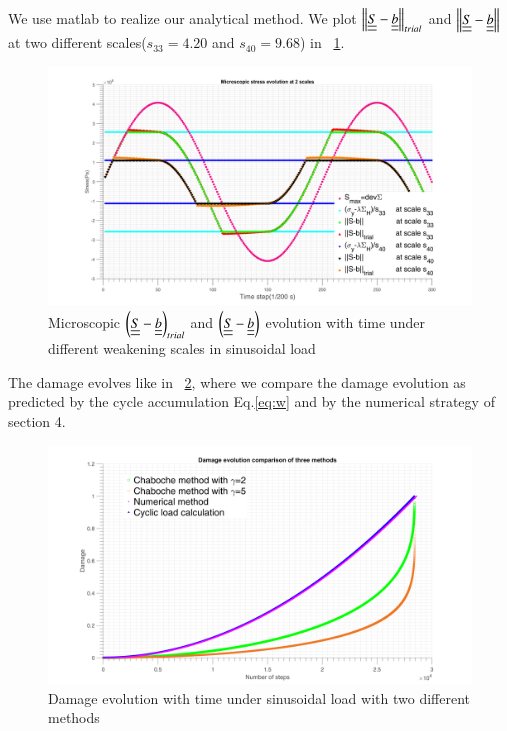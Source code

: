 \documentclass[3p,times,number,review]{elsarticle}
\newcommand{\figref}[1]{\figurename~\ref{#1}}
\begin{document}
We use matlab to realize our analytical method. We plot $\left\|  \uline{\uline{S}}-\uline{\uline{b}}\right\|_{trial}$ and $\left\|  \uline{\uline{S}}-\uline{\uline{b}}\right\|$ at two different scales($s_{33}=4.20$ and $s_{40}=9.68$) in \figref{trialsin}.
\begin{figure}[!h]
	\centering
	\includegraphics[width=\textwidth]{figures//trialsin.png} 
	\caption{Microscopic $\left(  \uline{\uline{S}}-\uline{\uline{b}}\right)_{trial}$ and $\left( \uline{\uline{S}}-\uline{\uline{b}}\right)$ evolution with time under different weakening scales in sinusoidal load}
	\label{trialsin}
\end{figure}

The damage evolves like in \figref{damsin}, where we compare the damage evolution as predicted by the cycle accumulation Eq.\eqref{eq:w} and by the numerical strategy of section 4.

\begin{figure}[!h]
	\centering
	\includegraphics[width=\textwidth]{figures//damagesin.png} 
	\caption{Damage evolution with time under sinusoidal load with two different methods}
	\label{damsin}
\end{figure}
\end{document}
